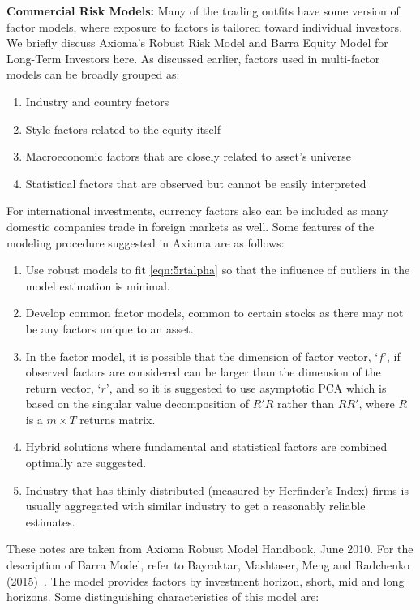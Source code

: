 \noindent\textbf{Commercial Risk Models:} Many of the trading outfits have some version of factor models, where exposure to factors is tailored toward individual investors. We briefly discuss Axioma's Robust Risk Model and Barra Equity Model for Long-Term Investors here. As discussed earlier, factors used in multi-factor models can be broadly grouped as:


\begin{enumerate}[--]
\item Industry and country factors
\item Style factors related to the equity itself
\item Macroeconomic factors that are closely related to asset's universe
\item Statistical factors that are observed but cannot be easily interpreted
\end{enumerate}


For international investments, currency factors also can be included as many domestic companies trade in foreign markets as well. Some features of the modeling procedure suggested in Axioma are as follows:


\begin{enumerate}[--]
\item Use robust models to fit \eqref{eqn:5rtalpha} so that the influence of outliers in the model estimation is minimal.
\item Develop common factor models, common to certain stocks as there may not be any factors unique to an asset.
\item In the factor model, it is possible that the dimension of factor vector, `$f$', if observed factors are considered can be larger than the dimension of the return vector, `$r$', and so it is suggested to use asymptotic PCA which is based on the singular value decomposition of $R'R$ rather than $RR'$, where $R$ is a $m \times T$ returns matrix.
\item Hybrid solutions where fundamental and statistical factors are combined optimally are suggested. 
\item Industry that has thinly distributed (measured by Herfinder's Index) firms is usually aggregated with similar industry to get a reasonably reliable estimates.
\end{enumerate}


These notes are taken from Axioma Robust Model Handbook, June 2010. For the description of Barra Model, refer to Bayraktar, Mashtaser, Meng and Radchenko (2015)~\cite{baymasmenrad15}. The model provides factors by investment horizon, short, mid and long horizons. Some distinguishing characteristics of this model are:


